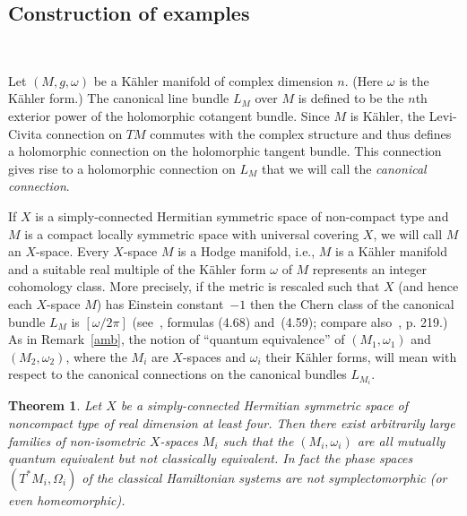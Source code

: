 \documentclass[12pt,leqno]{amsart}%
\newtheorem{theorem}{Theorem}[section]
\theoremstyle{definition}
\theoremstyle{remark}
\numberwithin{equation}{section}
\def\nab{{\nabla}}
\def\Spec{\operatorname{\textit{Spec}}}
\begin{document}
\subsection{Construction of examples}\label{ex}\

Let $(M, g, \omega)$ be a K\"ahler manifold of complex dimension $n$. (Here
$\omega$ is the K\"ahler
form.) The canonical line bundle $L_{M}$ over $M$ is defined to be the $n$th
exterior power of the holomorphic cotangent bundle. Since $M$ is K\"ahler, the
Levi-Civita connection on $TM$ commutes with the complex structure and thus
defines a holomorphic connection on the holomorphic tangent bundle. This
connection gives rise to a holomorphic connection on $L_{M}$ that we will call
the \emph{canonical connection}.

If $X$ is a simply-connected Hermitian
symmetric space of non-compact type and $M$ is
a compact locally symmetric space with universal covering $X$, we will call $M$
an $X$-space. Every $X$-space $M$ is a Hodge manifold, i.e., $M$ is a K\"ahler
manifold and a suitable real multiple
of the K\"ahler form $\omega$ of $M$ represents an integer cohomology
class. More precisely, if the metric is rescaled such that $X$ (and hence
each $X$-space $M$) has Einstein constant~$-1$
then the Chern class of the canonical bundle $L_{M}$ is
$[\omega/2\pi]$ (see~\cite{Ba}, formulas (4.68) and~(4.59);
compare also~\cite{We}, p. 219.) As in Remark~\ref{amb}, the notion of
``quantum equivalence'' of $(M_1,\omega_1)$ and $(M_2,\omega_2)$, where the
$M_i$ are $X$-spaces and $\omega_i$ their K\"ahler forms, will mean with respect
to the canonical connections on the canonical bundles $L_{M_i}$.





\begin{theorem}\label{herm}
Let $X$ be a simply-connected Hermitian symmetric space of noncompact type of
real dimension at least four. Then there exist arbitrarily large families of
non-isometric $X$-spaces $M_{i}$ such that the $(M_i,\omega_i)$ are all mutually
quantum equivalent but not classically equivalent. In fact the phase spaces
$(T^*M_i, \Omega_i)$ of the classical Hamiltonian systems are not
symplectomorphic {\rm(}or even homeomorphic{\rm)}.
\end{theorem}
\end{document}
